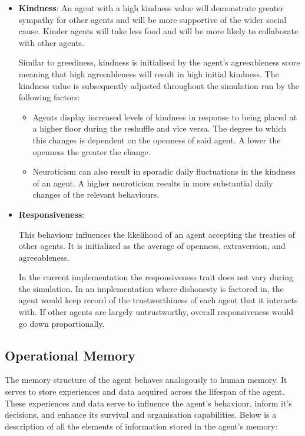 \begin{itemize}
    \item  \textbf{Kindness}: An agent with a high kindness value will demonstrate greater sympathy for other agents and will be more supportive of the wider social cause. Kinder agents will take less food and will be more likely to collaborate with other agents. 
    
    Similar to greediness, kindness is initialised by the agent's agreeableness score meaning that high agreeableness will result in high initial kindness. The kindness value is subsequently adjusted throughout the simulation run by the following factors:
    
    \begin{itemize}
        \item Agents display increased levels of kindness in response to being placed at a higher floor during the reshuffle and vice versa. The degree to which this changes is dependent on the openness of said agent. A lower the openness the greater the change.
        \item Neuroticism can also result in sporadic daily fluctuations in the kindness of an agent. A higher neuroticism results in more substantial daily changes of the relevant behaviours. 
    \end{itemize}
    
    \item  \textbf{Responsiveness}: 
    
    This behaviour influences the likelihood of an agent accepting the treaties of other agents. It is initialized as the average of openness, extraversion, and agreeableness. 
    
    In the current implementation the responsiveness trait does not vary during the simulation. In an implementation where dishonesty is factored in, the agent would keep record of the trustworthiness of each agent that it interacts with. If other agents are largely untrustworthy, overall responsiveness would go down proportionally. 
    
\end{itemize}

\subsection{Operational Memory}
\label{subsec: Operational Memory}
The memory structure of the agent behaves analogously to human memory. It serves to store experiences and data acquired across the lifespan of the agent. These experiences and data serve to influence the agent's behaviour, inform it's decisions, and enhance its survival and organisation capabilities. 
Below is a description of all the elements of information stored in the agent's memory:

